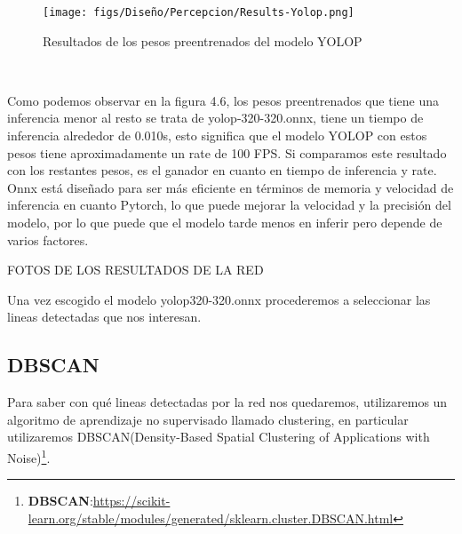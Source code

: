 \begin{figure} [H]
  \begin{center}
    \texttt{[image: figs/Diseño/Percepcion/Results-Yolop.png]}
  \end{center}
  \caption{Resultados de los pesos preentrenados del modelo YOLOP}
  \label{fig:pesos_preentrenados}
\end{figure}\

Como podemos observar en la figura 4.6, los pesos preentrenados que tiene una inferencia menor al resto se trata de yolop-320-320.onnx, tiene un tiempo de inferencia alrededor de 0.010s, esto
significa que el modelo YOLOP con estos pesos tiene aproximadamente un rate de 100 FPS. Si comparamos este resultado con los restantes pesos, es el ganador en cuanto 
en tiempo de inferencia y rate. 
Onnx está diseñado para ser más eficiente en términos de memoria y velocidad de inferencia en cuanto Pytorch, lo que puede mejorar la velocidad y la precisión
del modelo, por lo que puede que el modelo tarde menos en inferir pero depende de varios factores. 

FOTOS DE LOS RESULTADOS DE LA RED



Una vez escogido el modelo yolop320-320.onnx procederemos a seleccionar las lineas detectadas que nos interesan.

\subsection{DBSCAN}
\label{sec:DBSCAN}

Para saber con qué lineas detectadas por la red nos quedaremos, utilizaremos un algoritmo de aprendizaje no supervisado llamado clustering, en particular
utilizaremos DBSCAN(Density-Based Spatial Clustering of Applications with Noise)\footnote{\textbf{DBSCAN}:\url{https://scikit-learn.org/stable/modules/generated/sklearn.cluster.DBSCAN.html}}. 

